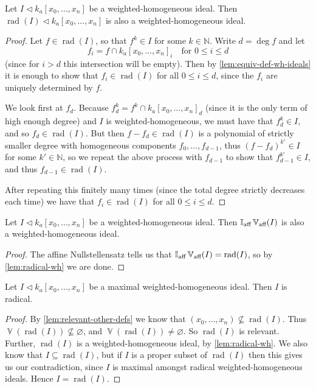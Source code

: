 \documentclass[10pt,notitlepage]{article}
\numberwithin{equation}{subsection}
\DeclareMathOperator{\van}{\mathbb{V}}
\DeclareMathOperator{\rad}{rad}
\DeclareMathOperator{\vanaff}{\mathbb{V}_{\textnormal{aff}}}
\DeclareMathOperator{\ideaff}{\mathbb{I}_{\textnormal{aff}}}
\newcommand{\nn}{\mathbb{N}}
\newcommand{\kazn}{k_a[x_0,\ldots,x_n]}
\begin{document}
    \begin{lemma}\label{lem:radical-wh}
        Let $I\triangleleft\kazn$ be a weighted-homogeneous ideal.
        Then $\rad(I)\triangleleft\kazn$ is also a weighted-homogeneous ideal.
    \end{lemma}

    \begin{proof}
        Let $f\in\rad(I)$, so that $f^k\in I$ for some $k\in\nn$.
        Write $d=\deg f$ and let
        \[
            f_i=f\cap\kazn_i\quad\text{for }0\leqslant i\leqslant d
        \]
        (since for $i>d$ this intersection will be empty).
        Then by \cref{lem:equiv-def-wh-ideals} it is enough to show that $f_i\in\rad(I)$ for all $0\leqslant i\leqslant d$, since the $f_i$ are uniquely determined by $f$.

        We look first at $f_d$.
        Because $f_d^k=f^k\cap\kazn_d$ (since it is the only term of high enough degree) and $I$ is weighted-homogeneous, we must have that $f_d^k\in I$, and so $f_d\in\rad(I)$.
        But then $f-f_d\in\rad(I)$ is a polynomial of strictly smaller degree with homogeneous components $f_0,\ldots,f_{d-1}$, thus $(f-f_d)^{k'}\in I$ for some $k'\in\nn$, so we repeat the above process with $f_{d-1}$ to show that $f_{d-1}^{k'}\in I$, and thus $f_{d-1}\in\rad(I)$.

        After repeating this finitely many times (since the total degree strictly decreases each time) we have that $f_i\in\rad(I)$ for all $0\leqslant i\leqslant d$.
    \end{proof}

    \begin{corollary}\label{cor:ideaff-cone-is-wh}
        Let $I\triangleleft\kazn$ be a weighted-homogeneous ideal.
        Then $\ideaff\vanaff(I)$ is also a weighted-homogeneous ideal.
    \end{corollary}

    \begin{proof}
        The affine Nullstellensatz tells us that $\ideaff\vanaff(I)=\rad(I)$, so by \cref{lem:radical-wh} we are done.
    \end{proof}

    \begin{lemma}\label{lem:max-wh-are-radical}
        Let $I\triangleleft\kazn$ be a maximal weighted-homogeneous ideal.
        Then $I$ is radical.
    \end{lemma}

    \begin{proof}
        By \cref{lem:relevant-other-defs} we know that $(x_0,\ldots,x_n)\not\subseteq\rad(I)$.
        Thus $\van(\rad(I))\not\subseteq\varnothing$, and $\van(\rad(I))\neq\varnothing$.
        So $\rad(I)$ is relevant.
        Further, $\rad(I)$ is a weighted-homogeneous ideal, by \cref{lem:radical-wh}.
        We also know that $I\subseteq\rad(I)$, but if $I$ is a proper subset of $\rad(I)$ then this gives us our contradiction, since $I$ is maximal amongst radical weighted-homogeneous ideals.
        Hence $I=\rad(I)$.
    \end{proof}
\end{document}
